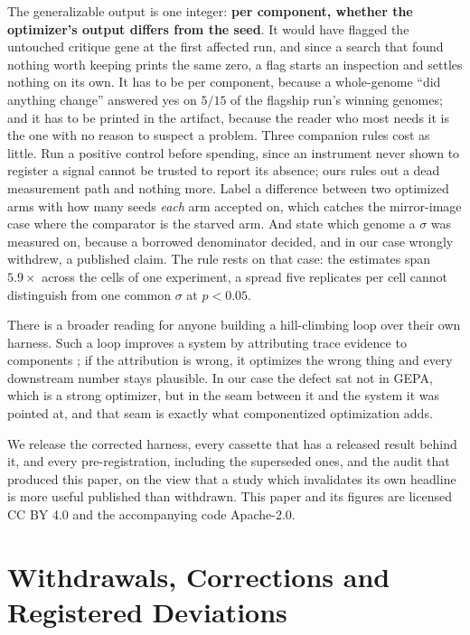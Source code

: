 \documentclass[11pt]{article}
\begin{document}
The generalizable output is one integer: \textbf{per component, whether the optimizer's output
differs from the seed}. It would have flagged the untouched critique gene at the first affected
run, and since a search that found nothing worth keeping prints the same zero, a flag starts an
inspection and settles nothing on its own. It has to be
per component, because a whole-genome ``did anything change'' answered yes on $5/15$ of the
flagship run's winning genomes;
and it has to be printed in the artifact, because the reader who most needs it is the one with no
reason to suspect a problem. Three companion rules cost as little. Run a positive control before
spending, since an instrument never shown to register a signal cannot be trusted to report its
absence; ours rules out a dead measurement path and nothing more. Label a difference between two optimized
arms with how many seeds \emph{each} arm accepted on, which catches the mirror-image case where the
comparator is the starved arm. And state which genome a $\sigma$ was measured on, because a
borrowed denominator decided, and in our case wrongly withdrew, a published claim. The rule rests
on that case: the estimates span $5.9\times$ across the cells of one experiment, a spread five
replicates per cell cannot distinguish from one common $\sigma$ at $p<0.05$.

There is a broader reading for anyone building a hill-climbing loop over their own harness. Such a
loop improves a system by attributing trace evidence to components \citep{langchain2026loopcraft};
if the attribution is wrong, it optimizes the wrong thing and every downstream number stays
plausible. In our case the defect sat not in GEPA, which is a strong optimizer, but in the seam
between it and the system it was pointed at, and that seam is exactly what componentized
optimization adds.

We release the corrected harness, every cassette that has a released result behind it, and
every pre-registration, including the superseded ones, and the audit that produced this paper, on the view that a study which invalidates its own
headline is more useful published than withdrawn. This paper and its figures are licensed CC BY 4.0
and the accompanying code Apache-2.0.




\appendix

\section{Withdrawals, Corrections and Registered Deviations}
\label{sec:corrections}
\end{document}
